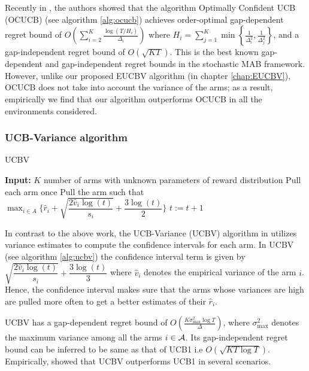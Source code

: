 Recently in \citet{lattimore2015optimally}, the authors showed that the algorithm Optimally Confident UCB (OCUCB) (see algorithm \ref{alg:ocucb}) achieves order-optimal gap-dependent regret bound of $O\left(\sum_{i=2}^{K}\frac{\log\left(T/H_i\right)}{\Delta_i}\right)$ where $H_i=\sum_{j=1}^{K}\min\left\lbrace \frac{1}{\Delta_i^2},\frac{1}{\Delta_j^2}\right\rbrace$, and a gap-independent regret bound of $O\left( \sqrt{KT}\right)$. This is the best known gap-dependent and gap-independent regret bounds in the stochastic MAB framework. However, unlike our proposed EUCBV algorithm (in chapter \ref{chap:EUCBV}), OCUCB does not take into account the variance of the arms; as a result, empirically  we find  that our algorithm outperforms OCUCB in all the environments considered.




	

\subsubsection{UCB-Variance algorithm}

\begin{algorithm}[!th]
\caption{UCBV}
\label{alg:ucbv}
\begin{algorithmic}[1]
\State \textbf{Input:} $K$ number of arms with unknown parameters of reward distribution
\State Pull each arm once
\State Pull the arm such that $\max_{i\in A}\bigg\lbrace\hat{r}_{i} + \sqrt{\dfrac{2\hat{v}_i\log (t)}{s_i}} + \dfrac{3\log (t)}{2}\bigg\rbrace$
\State $t:=t+1 $
 \EndFor
\end{algorithmic}
\end{algorithm}


    In contrast to the above work, the UCB-Variance (UCBV) algorithm in \citet{audibert2009exploration} utilizes variance estimates to compute the confidence intervals for each arm. In UCBV (see algorithm \ref{alg:ucbv}) the confidence interval term is given by $\sqrt{\dfrac{2\hat{v}_i\log (t)}{s_i}} + \dfrac{3\log (t)}{3}$ where $\hat{v}_i$ denotes the empirical variance of the arm $i$. Hence, the confidence interval makes sure that the arms whose variances are high are pulled more often to get a better estimates of their $\hat{r}_i$.
    
    UCBV has a gap-dependent regret bound of $O\left(\frac{K\sigma_{\max}^{2}\log T}{\Delta}\right)$, where $\sigma_{\max}^{2}$ denotes the maximum variance among all the arms $i\in \mathcal{A}$. Its gap-independent regret bound can be inferred to be same as that of UCB1 i.e $O \left(\sqrt{KT\log T}\right)$. Empirically, \citet{audibert2009exploration} showed that UCBV outperforms UCB1 in several scenarios. 


